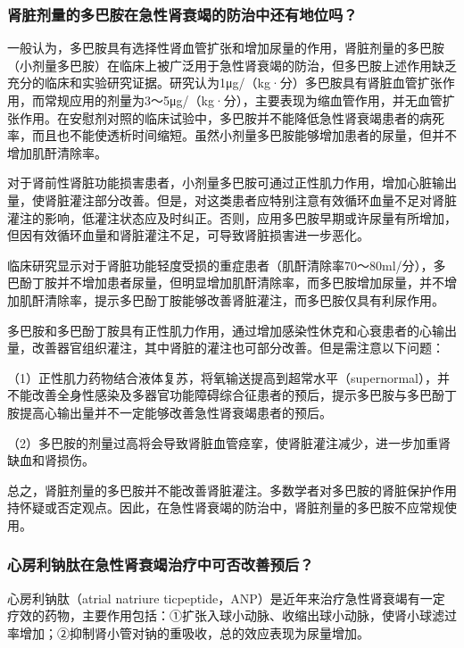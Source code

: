 \subsubsection{肾脏剂量的多巴胺在急性肾衰竭的防治中还有地位吗？}

一般认为，多巴胺具有选择性肾血管扩张和增加尿量的作用，肾脏剂量的多巴胺（小剂量多巴胺）在临床上被广泛用于急性肾衰竭的防治，但多巴胺上述作用缺乏充分的临床和实验研究证据。研究认为1μg/（kg·分）多巴胺具有肾脏血管扩张作用，而常规应用的剂量为3～5μg/（kg·分），主要表现为缩血管作用，并无血管扩张作用。在安慰剂对照的临床试验中，多巴胺并不能降低急性肾衰竭患者的病死率，而且也不能使透析时间缩短。虽然小剂量多巴胺能够增加患者的尿量，但并不增加肌酐清除率。

对于肾前性肾脏功能损害患者，小剂量多巴胺可通过正性肌力作用，增加心脏输出量，使肾脏灌注部分改善。但是，对这类患者应特别注意有效循环血量不足对肾脏灌注的影响，低灌注状态应及时纠正。否则，应用多巴胺早期或许尿量有所增加，但因有效循环血量和肾脏灌注不足，可导致肾脏损害进一步恶化。

临床研究显示对于肾脏功能轻度受损的重症患者（肌酐清除率70～80ml/分），多巴酚丁胺并不增加患者尿量，但明显增加肌酐清除率，而多巴胺增加尿量，并不增加肌酐清除率，提示多巴酚丁胺能够改善肾脏灌注，而多巴胺仅具有利尿作用。

多巴胺和多巴酚丁胺具有正性肌力作用，通过增加感染性休克和心衰患者的心输出量，改善器官组织灌注，其中肾脏的灌注也可部分改善。但是需注意以下问题：

（1）正性肌力药物结合液体复苏，将氧输送提高到超常水平（supernormal），并不能改善全身性感染及多器官功能障碍综合征患者的预后，提示多巴胺与多巴酚丁胺提高心输出量并不一定能够改善急性肾衰竭患者的预后。

（2）多巴胺的剂量过高将会导致肾脏血管痉挛，使肾脏灌注减少，进一步加重肾缺血和肾损伤。

总之，肾脏剂量的多巴胺并不能改善肾脏灌注。多数学者对多巴胺的肾脏保护作用持怀疑或否定观点。因此，在急性肾衰竭的防治中，肾脏剂量的多巴胺不应常规使用。

\subsubsection{心房利钠肽在急性肾衰竭治疗中可否改善预后？}

心房利钠肽（atrial natriure
ticpeptide，ANP）是近年来治疗急性肾衰竭有一定疗效的药物，主要作用包括：①扩张入球小动脉、收缩出球小动脉，使肾小球滤过率增加；②抑制肾小管对钠的重吸收，总的效应表现为尿量增加。

